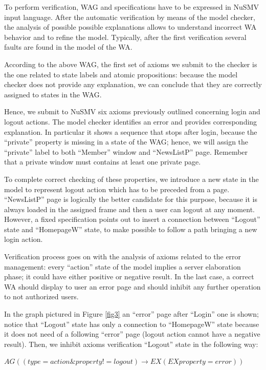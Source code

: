 To perform verification, WAG and \ctl specifications have to be expressed in NuSMV input language. After the automatic verification by means of the model checker, the analysis of possible possible explanations allows to understand incorrect WA behavior and to refine the model. Typically, after the first verification several faults are found in the model of the WA.

According to the above WAG, the first set of axioms we submit to the checker is the one related to state labels and atomic propositions: because the model checker does not provide any explanation, we can conclude that they are correctly assigned to states in the WAG.

Hence, we submit to NuSMV six axioms previously outlined concerning login and logout actions. The model checker identifies an error and provides corresponding explanation. In particular it shows a sequence that stops after login, because the ``private'' property is missing in a state of the WAG; hence, we will assign the ``private'' label to both ``Member'' window and ``NewsListP'' page. Remember that a private window must contains at least one private page.

To complete correct checking of these properties, we introduce a new state in the model to represent logout action which has to be preceded from a page. ``NewsListP'' page is logically the better candidate for this purpose, because it is always loaded in the assigned frame and then a user can logout at any moment. However, a fixed specification points out to insert a connection between ``Logout'' state and ``HomepageW'' state, to make possible to follow a path bringing a new login action.

Verification process goes on with the analysis of axioms related to the error management: every ``action'' state of the model implies a server elaboration phase; it could have either positive or negative result. In the last case, a correct WA should display to user an error page and should inhibit any further operation to not authorized users.

In the graph pictured in Figure \ref{fig3} an ``error'' page after ``Login'' one is shown; notice that ``Logout'' state has only a connection to ``HomepageW'' state because it does not need of a following ``error'' page (logout action cannot have a negative result). Then, we inhibit axioms verification ``Logout'' state in the following way: 

\centerline{$AG ((type=action \& property!=logout) \rightarrow EX(EX property=error))$}

